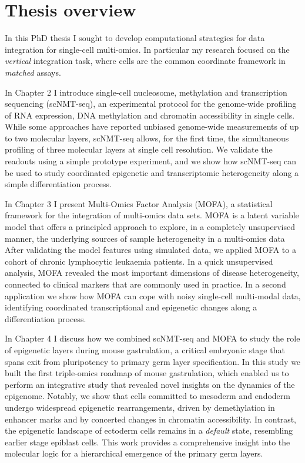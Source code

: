 \section{Thesis overview}

In this PhD thesis I sought to develop computational strategies for data integration for single-cell multi-omics. In particular my research focused on the \textit{vertical} integration task, where cells are the common coordinate framework in \textit{matched} assays.

In Chapter 2 I introduce single-cell nucleosome, methylation and transcription sequencing (scNMT-seq), an experimental protocol for the genome-wide profiling of RNA expression, DNA methylation and chromatin accessibility in single cells. While some approaches have reported unbiased genome-wide measurements of up to two molecular layers, scNMT-seq allows, for the first time, the simultaneous profiling of three molecular layers at single cell resolution. We validate the readouts using a simple prototype experiment, and we show how scNMT-seq can be used to study coordinated epigenetic and transcriptomic heterogeneity along a simple differentiation process.

In Chapter 3 I present Multi-Omics Factor Analysis (MOFA), a statistical framework for the integration of multi-omics data sets. MOFA is a latent variable model that offers a principled approach to explore, in a completely unsupervised manner, the underlying sources of sample heterogeneity in a multi-omics data After validating the model features using simulated data, we applied MOFA to a cohort of chronic lymphocytic leukaemia patients. In a quick unsupervised analysis, MOFA revealed the most important dimensions of disease heterogeneity, connected to clinical markers that are commonly used in practice. In a second application we show how MOFA can cope with noisy single-cell multi-modal data, identifying coordinated transcriptional and epigenetic changes along a differentiation process.

In Chapter 4 I discuss how we combined scNMT-seq and MOFA to study the role of epigenetic layers during mouse gastrulation, a critical embryonic stage that spans exit from pluripotency to primary germ layer specification. In this study we built the first triple-omics roadmap of mouse gastrulation, which enabled us to perform an integrative study that revealed novel insights on the dynamics of the epigenome. Notably, we show that cells committed to mesoderm and endoderm undergo widespread epigenetic rearrangements, driven by demethylation in enhancer marks and by concerted changes in chromatin accessibility. In contrast, the epigenetic landscape of ectoderm cells remains in a \textit{default} state, resembling earlier stage epiblast cells. This work provides a comprehensive insight into the molecular logic for a hierarchical emergence of the primary germ layers.

